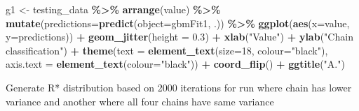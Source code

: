 \documentclass[
]{article}
\newenvironment{Shaded}{\begin{snugshade}}{\end{snugshade}}
\newcommand{\AttributeTok}[1]{\textcolor[rgb]{0.13,0.29,0.53}{#1}}
\newcommand{\DecValTok}[1]{\textcolor[rgb]{0.00,0.00,0.81}{#1}}
\newcommand{\FloatTok}[1]{\textcolor[rgb]{0.00,0.00,0.81}{#1}}
\newcommand{\FunctionTok}[1]{\textcolor[rgb]{0.13,0.29,0.53}{\textbf{#1}}}
\newcommand{\NormalTok}[1]{#1}
\newcommand{\OtherTok}[1]{\textcolor[rgb]{0.56,0.35,0.01}{#1}}
\newcommand{\SpecialCharTok}[1]{\textcolor[rgb]{0.81,0.36,0.00}{\textbf{#1}}}
\newcommand{\StringTok}[1]{\textcolor[rgb]{0.31,0.60,0.02}{#1}}
\begin{document}
\begin{Shaded}
\begin{Highlighting}[]
\NormalTok{g1 }\OtherTok{\textless{}{-}}\NormalTok{ testing\_data }\SpecialCharTok{\%\textgreater{}\%} 
  \FunctionTok{arrange}\NormalTok{(value) }\SpecialCharTok{\%\textgreater{}\%} 
  \FunctionTok{mutate}\NormalTok{(}\AttributeTok{predictions=}\FunctionTok{predict}\NormalTok{(}\AttributeTok{object=}\NormalTok{gbmFit1, .)) }\SpecialCharTok{\%\textgreater{}\%} 
  \FunctionTok{ggplot}\NormalTok{(}\FunctionTok{aes}\NormalTok{(}\AttributeTok{x=}\NormalTok{value, }\AttributeTok{y=}\NormalTok{predictions)) }\SpecialCharTok{+}
  \FunctionTok{geom\_jitter}\NormalTok{(}\AttributeTok{height =} \FloatTok{0.3}\NormalTok{) }\SpecialCharTok{+}
  \FunctionTok{xlab}\NormalTok{(}\StringTok{"Value"}\NormalTok{) }\SpecialCharTok{+}
  \FunctionTok{ylab}\NormalTok{(}\StringTok{"Chain classification"}\NormalTok{) }\SpecialCharTok{+}
  \FunctionTok{theme}\NormalTok{(}\AttributeTok{text =} \FunctionTok{element\_text}\NormalTok{(}\AttributeTok{size=}\DecValTok{18}\NormalTok{, }\AttributeTok{colour=}\StringTok{"black"}\NormalTok{),}
        \AttributeTok{axis.text =} \FunctionTok{element\_text}\NormalTok{(}\AttributeTok{colour=}\StringTok{"black"}\NormalTok{)) }\SpecialCharTok{+}
  \FunctionTok{coord\_flip}\NormalTok{() }\SpecialCharTok{+}
  \FunctionTok{ggtitle}\NormalTok{(}\StringTok{"A."}\NormalTok{)}
\end{Highlighting}
\end{Shaded}

Generate R* distribution based on 2000 iterations for run where chain
has lower variance and another where all four chains have same variance
\end{document}
